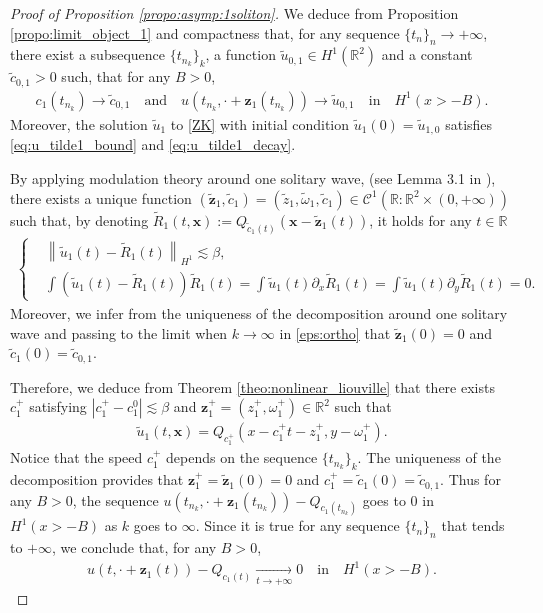 \documentclass[reqno,10pt]{amsart}
\numberwithin{equation}{section}
\newcommand{\bx}{\mathbf{x}}
\newcommand{\bz}{\mathbf{z}}
\begin{document}
 \begin{proof}[Proof of Proposition \ref{propo:asymp:1soliton}]
We deduce from Proposition \ref{propo:limit_object_1} and compactness that, for any sequence $\{t_n\}_n\rightarrow +\infty$, there exist a subsequence $\{t_{n_k}\}_k$, a function $\tilde{u}_{0,1} \in H^1(\mathbb R^2)$ and a constant $\tilde{c}_{0,1}>0$ such, that for any $B>0$,
\begin{align} \label{conv.tilde_u_01.1}
	c_1(t_{n_k}) \rightarrow \tilde{c}_{0,1} \quad \text{and} \quad u\left(t_{n_k}, \cdot + \bz_1(t_{n_k}) \right) \rightarrow \tilde{u}_{0,1} \quad \text{in} \quad H^1(x>-B).
\end{align}
Moreover, the solution $\tilde{u}_1$ to \ref{ZK} with initial condition $\tilde{u}_1(0)= \tilde{u}_{1,0}$ satisfies \eqref{eq:u_tilde1_bound} and \eqref{eq:u_tilde1_decay}. 

By applying modulation theory around one solitary wave, (see Lemma 3.1 in \cite{CMPS16}), there exists a unique function $\left( \tilde{\bz}_1,\tilde{c}_1 \right)= (\tilde{z}_1,\tilde{\omega}_1,\tilde{c}_1) \in \mathcal{C}^1(\mathbb{R} : \mathbb{R}^2 \times(0,+\infty))$ such that, by denoting $\tilde{R}_1 (t,\bx) := Q_{\tilde{c}_1(t)} \left( \bx - \tilde{\bz}_1(t)\right)$, it holds for any $t\in \mathbb{R}$
	\begin{align*}
 \begin{cases}
		& \left\| \tilde{u}_1(t) - \tilde{R}_1(t) \right\|_{H^1} \lesssim \beta, \\
		& \int \left( \tilde{u}_1(t) -\tilde{R}_1(t) \right) \tilde{R}_1(t)=\int \tilde{u}_1(t) \partial_x \tilde{R}_1(t)=\int \tilde{u}_1(t) \partial_y \tilde{R}_1(t)=0.
  \end{cases}
	\end{align*}
 Moreover, we infer from the uniqueness of the decomposition around one solitary wave and passing to the limit when $k \to \infty$ in \eqref{eps:ortho} that $\tilde{\bz}_1(0)=0$ and $\tilde{c}_1(0)=\tilde{c}_{0,1}$.
 
	Therefore, we deduce from Theorem \ref{theo:nonlinear_liouville} that there exists $c_1^+$ satisfying $|c_1^+-c_1^0| \lesssim \beta$ and $\bz^+_1=(z_1^+,\omega_1^+)\in \mathbb{R}^2$ such that  
	\begin{align} \label{conv.tilde_u_01.2}
		\tilde{u}_{1}(t,\bx) = Q_{c_1^+} \left( x-c_1^+t-z_1^+,y-\omega_1^+ \right).
    \end{align}
	Notice that the speed $c_1^+$ depends on the sequence $\{t_{n_k}\}_k$. The uniqueness of the decomposition provides that $\bz_1^+=\tilde{\bz}_1(0)=0$ and $c_1^+=\tilde{c}_1(0)=\tilde{c}_{0,1}$. Thus for any $B>0$, the sequence $u\left(t_{n_k},\cdot + \bz_1(t_{n_k}) \right)- Q_{c_1(t_{n_k})}$ goes to $0$ in $H^1(x>-B)$ as $k$ goes to $\infty$. Since it is true for any sequence $\{t_n\}_n$ that tends to $+\infty$, we conclude that, for any $B>0$,
	\begin{align}\label{eq:conv_u-Q_c1}
		u \left( t, \cdot + \bz_1(t) \right) - Q_{c_1(t)} \underset{t \to +\infty}{\longrightarrow} 0 \quad \text{in} \quad H^1(x>-B).
	\end{align}


\end{proof}
\end{document}
